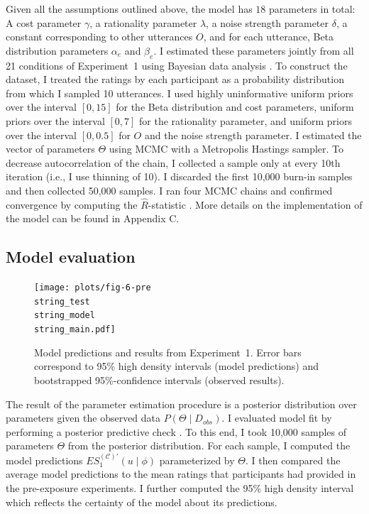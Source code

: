 Given all the assumptions outlined above, the model has  $18$ parameters in total: A cost parameter $\gamma$, a rationality parameter $\lambda$, a noise strength parameter $\delta$, a constant corresponding to other utterances $O$, and for each utterance, Beta distribution parameters $\alpha_e$ and $\beta_e$. I estimated these parameters jointly from all 21 conditions of Experiment~1 using Bayesian data analysis \parencite[BDA; see, e.g.,][]{Kruschke2015}. To construct the dataset, I treated the ratings by each participant as a probability distribution from which I sampled 10 utterances. I used highly uninformative
uniform priors over the interval $[0,15]$ for the Beta distribution and cost parameters, uniform priors over the interval $[0,7]$ for the rationality parameter, and uniform priors over the interval $[0,0.5]$ for $O$ and the noise strength parameter. I estimated the vector of parameters $\Theta$ using MCMC with a Metropolis Hastings sampler. To decrease autocorrelation of the chain, I collected a sample only at every 10th iteration (i.e., I use thinning of 10). I discarded the first 10,000 burn-in samples and then collected 50,000 samples.  I ran four MCMC chains and confirmed convergence by computing the $\hat{R}$-statistic \cite{Gelman2003}. More details on the implementation of the model can be found in Appendix C.

\subsection{Model evaluation}

\begin{figure}[th!]
\texttt{[image: plots/fig-6-pre\\string\_test\\string\_model\\string\_main.pdf]}
\caption{Model predictions and results from Experiment~1. Error bars correspond to 95\% high density intervals (model predictions) and bootstrapped 95\%-confidence intervals (observed results). \label{fig:norming-results-model-main}}
\end{figure}


The result of the parameter estimation procedure is a posterior distribution over parameters given the observed data $P(\Theta \mid D_{obs})$. I evaluated
 model fit by performing a posterior predictive check \parencite[PPC;][]{Kruschke2015}. To this end, I took 10,000 samples of parameters $\Theta$ from the posterior distribution. For each sample, I computed the model predictions $ES_1^{(\mathscr{C})'}(u \mid \phi)$ parameterized by $\Theta$. I then compared the average model predictions to the
mean ratings that participants had provided in the pre-exposure experiments. I further computed the 95\% high density interval  \parencite[HDI;][]{Kruschke2015} which reflects the certainty of the model
about its predictions.

